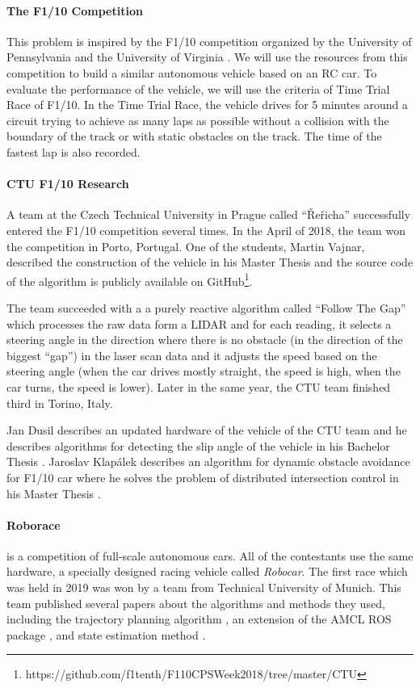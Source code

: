 \paragraph{The F1/10 Competition}

This problem is inspired by the F1/10 competition organized by the University of Pennsylvania and the University of Virginia \cite{F1/10_web}. We will use the resources from this competition to build a similar autonomous vehicle based on an RC car. To evaluate the performance of the vehicle, we will use the criteria of Time Trial Race of F1/10. In the Time Trial Race, the vehicle drives for 5 minutes around a circuit trying to achieve as many laps as possible without a collision with the boundary of the track or with static obstacles on the track. The time of the fastest lap is also recorded.

\paragraph{CTU F1/10 Research} A team at the Czech Technical University in Prague called ``Řeřicha'' successfully entered the F1/10 competition several times. In the April of 2018, the team won the competition in Porto, Portugal. One of the students, Martin Vajnar, described the construction of the vehicle in his Master Thesis \cite{ctu_martin_vajnar} and the source code of the algorithm is publicly available on GitHub\footnote{https://github.com/f1tenth/F110CPSWeek2018/tree/master/CTU}.

The team succeeded with a a purely reactive algorithm called ``Follow The Gap'' which processes the raw data form a LIDAR and for each reading, it selects a steering angle in the direction where there is no obstacle (in the direction of the biggest ``gap'') in the laser scan data and it adjusts the speed based on the steering angle (when the car drives mostly straight, the speed is high, when the car turns, the speed is lower). Later in the same year, the CTU team finished third in Torino, Italy.

Jan Dusil describes an updated hardware of the vehicle of the CTU team and he describes algorithms for detecting the slip angle of the vehicle in his Bachelor Thesis \cite{ctu_jan_dusil}. Jaroslav Klapálek describes an algorithm for dynamic obstacle avoidance for F1/10 car where he solves the problem of distributed intersection control in his Master Thesis \cite{ctu_jaroslav_klapalek}.

\paragraph{Roborace} is a competition of full-scale autonomous cars. All of the contestants use the same hardware, a specially designed racing vehicle called \textit{Robocar}. The first race which was held in 2019 was won by a team from Technical University of Munich. This team published several papers about the algorithms and methods they used, including the trajectory planning algorithm \cite{tum_roborace_planning}, an extension of the AMCL ROS package \cite{tum_roborace_ros}, and state estimation method \cite{tum_roborace_state_estimation}.